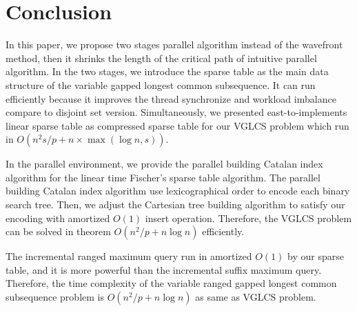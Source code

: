 \section{Conclusion}
\label{sec:Conclusion}

In this paper, we propose two stages parallel algorithm instead of the
wavefront method, then it shrinks the length of the critical path of
intuitive parallel algorithm.  In the two stages, we introduce the
sparse table as the main data structure of the variable gapped longest
common subsequence.  It can run efficiently because it improves the
thread synchronize and workload imbalance compare to disjoint set
version.  Simultaneously, we presented east-to-implements linear sparse
table as compressed sparse table for our VGLCS problem which run in
$O(n^2 s / p + n \times \max(\log n, s))$.

In the parallel environment, we provide the parallel building Catalan
index algorithm for the linear time Fischer's sparse table algorithm.
The parallel building Catalan index algorithm use lexicographical order
to encode each binary search tree.  Then, we adjust the Cartesian tree
building algorithm to satisfy our encoding with amortized $O(1)$ insert
operation.  Therefore, the VGLCS problem can be solved in theorem $O(n^2
/ p + n \log n)$ efficiently.

The incremental ranged maximum query run in amortized $O(1)$ by our
sparse table, and it is more powerful than the incremental suffix
maximum query. Therefore, the time complexity of the variable ranged
gapped longest common subsequence problem is $O(n^2 / p + n \log n)$ as
same as VGLCS problem.
